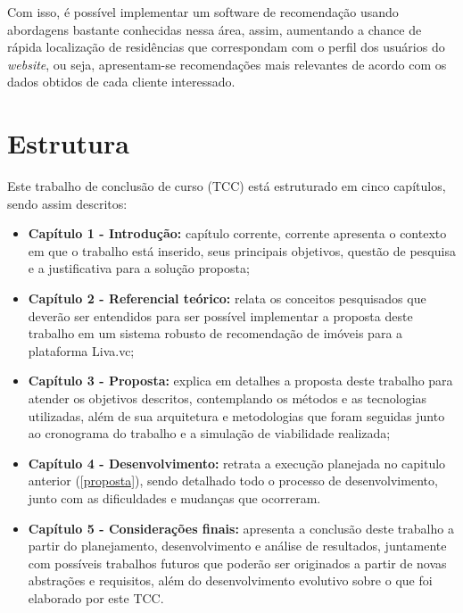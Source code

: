 Com isso, é possível implementar um software de recomendação usando abordagens bastante conhecidas nessa área, assim, aumentando a chance de rápida localização de residências que correspondam com o perfil dos usuários do \textit{website}, ou seja, apresentam-se recomendações mais relevantes de acordo com os dados obtidos de cada cliente interessado.

\section{Estrutura}

Este trabalho de conclusão de curso (TCC) está estruturado em cinco capítulos, sendo assim descritos:

\begin{itemize}
    \item \textbf{Capítulo 1 - Introdução:} capítulo corrente, corrente apresenta o contexto em que o trabalho está inserido, seus principais objetivos, questão de pesquisa e a justificativa para a solução proposta;

    \item \textbf{Capítulo 2 - Referencial teórico:} relata os conceitos pesquisados que deverão ser entendidos para ser possível implementar a proposta deste trabalho em um sistema robusto de recomendação de imóveis para a plataforma Liva.vc;
    
   \item \textbf{Capítulo 3 - Proposta:} explica em detalhes a proposta deste trabalho para atender os objetivos descritos, contemplando os métodos e as tecnologias utilizadas, além de sua arquitetura e metodologias que foram seguidas junto ao cronograma do trabalho e a simulação de viabilidade realizada;
   
   \item \textbf{Capítulo 4 - Desenvolvimento:} retrata a execução planejada no capitulo anterior (\ref{proposta}), sendo detalhado todo o processo de desenvolvimento, junto com as dificuldades e mudanças que ocorreram.

   \item \textbf{Capítulo 5 - Considerações finais:} apresenta a conclusão deste trabalho a partir do planejamento, desenvolvimento e análise de resultados, juntamente com possíveis trabalhos futuros que poderão ser originados a partir de novas abstrações e requisitos, além do desenvolvimento evolutivo sobre o que foi elaborado por este TCC.
\end{itemize}
